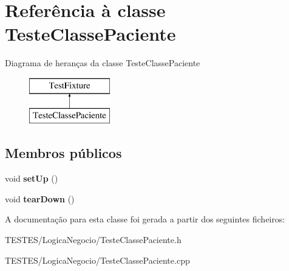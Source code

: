 \hypertarget{class_teste_classe_paciente}{\section{Referência à classe Teste\-Classe\-Paciente}
\label{class_teste_classe_paciente}
}
Diagrama de heranças da classe Teste\-Classe\-Paciente\begin{figure}[H]
\begin{center}
\leavevmode
\includegraphics[height=2.000000cm]{class_teste_classe_paciente}
\end{center}
\end{figure}
\subsection*{Membros públicos}
\begin{DoxyCompactItemize}
\item 
\hypertarget{class_teste_classe_paciente_a3622a20ec779d2b1feb049c6c8e5e9d9}{void {\bfseries set\-Up} ()}\label{class_teste_classe_paciente_a3622a20ec779d2b1feb049c6c8e5e9d9}

\item 
\hypertarget{class_teste_classe_paciente_ab98e0ede4020f942cd4540d1f68ce1e4}{void {\bfseries tear\-Down} ()}\label{class_teste_classe_paciente_ab98e0ede4020f942cd4540d1f68ce1e4}

\end{DoxyCompactItemize}


A documentação para esta classe foi gerada a partir dos seguintes ficheiros\-:\begin{DoxyCompactItemize}
\item 
T\-E\-S\-T\-E\-S/\-Logica\-Negocio/Teste\-Classe\-Paciente.\-h\item 
T\-E\-S\-T\-E\-S/\-Logica\-Negocio/Teste\-Classe\-Paciente.\-cpp\end{DoxyCompactItemize}
